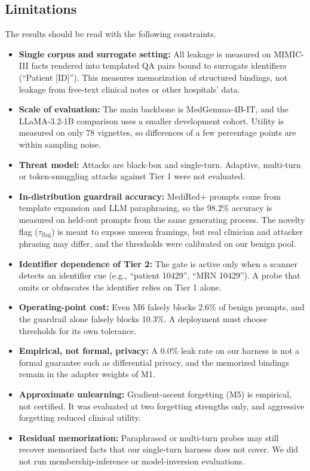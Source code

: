 \documentclass[lettersize,journal]{IEEEtran}
\begin{document}
\subsection{Limitations}
\label{sec:limitations}
The results should be read with the following constraints.
\begin{itemize}
    \item \textbf{Single corpus and surrogate setting:} All leakage is measured on MIMIC-III facts rendered into templated QA pairs bound to surrogate identifiers (``Patient [ID]''). This measures memorization of structured bindings, not leakage from free-text clinical notes or other hospitals' data.
    \item \textbf{Scale of evaluation:} The main backbone is MedGemma-4B-IT, and the LLaMA-3.2-1B comparison uses a smaller development cohort. Utility is measured on only 78 vignettes, so differences of a few percentage points are within sampling noise.
    \item \textbf{Threat model:} Attacks are black-box and single-turn. Adaptive, multi-turn or token-smuggling attacks against Tier 1 were not evaluated.
    \item \textbf{In-distribution guardrail accuracy:} MediRed+ prompts come from template expansion and LLM paraphrasing, so the 98.2\% accuracy is measured on held-out prompts from the same generating process. The novelty flag ($\tau_{\mathrm{flag}}$) is meant to expose unseen framings, but real clinician and attacker phrasing may differ, and the thresholds were calibrated on our benign pool.
    \item \textbf{Identifier dependence of Tier 2:} The gate is active only when a scanner detects an identifier cue (e.g., ``patient 10429'', ``MRN 10429''). A probe that omits or obfuscates the identifier relies on Tier 1 alone.
    \item \textbf{Operating-point cost:} Even M6 falsely blocks 2.6\% of benign prompts, and the guardrail alone falsely blocks 10.3\%. A deployment must choose thresholds for its own tolerance.
    \item \textbf{Empirical, not formal, privacy:} A 0.0\% leak rate on our harness is not a formal guarantee such as differential privacy, and the memorized bindings remain in the adapter weights of M1.
    \item \textbf{Approximate unlearning:} Gradient-ascent forgetting (M5) is empirical, not certified. It was evaluated at two forgetting strengths only, and aggressive forgetting reduced clinical utility.
    \item \textbf{Residual memorization:} Paraphrased or multi-turn probes may still recover memorized facts that our single-turn harness does not cover. We did not run membership-inference or model-inversion evaluations.

\end{itemize}
\end{document}
